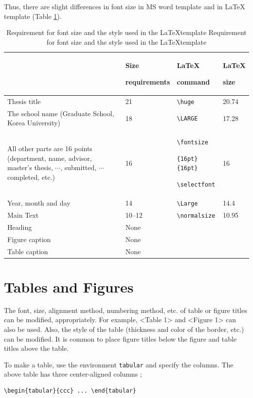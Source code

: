 Thus, there are slight differences in font size in MS word template and in \LaTeX ~ template
(Table \ref{tab:font size}). 

\begin{table}
\caption{Requirement for font size and the style used in the \LaTeX template Requirement for font size and the style used in the \LaTeX template}\label{tab:font size}
\bigskip
\begin{tabular}{>{\centering\arraybackslash}p{5.5cm}p{2.5cm}p{2.5cm}p{1.5cm}}
\toprule
&Size \par requirements & \LaTeX \par command & \LaTeX \par size \\\midrule
Thesis title			&21&\verb|\huge| & 20.74 \\\midrule
The school name (Graduate School, Korea University)
					&18&\verb|\LARGE| & 17.28 \\\midrule
All other parts are 16 points (department, name, advisor, master's thesis, \(\cdots\), submitted, \(\cdots\) completed, etc.)	
					&16&\verb|\fontsize| \par \verb|{16pt}{16pt}| \par \verb|\selectfont|  & 16 \\\midrule

Year, month and day	&14&\verb|\Large| & 14.4  \\\midrule
Main Text			&10--12&\verb|\normalsize| & 10.95 \\\midrule
Heading				&None&\\\midrule
Figure caption			&None&\\\midrule
Table caption			&None&\\\bottomrule
\end{tabular}
\end{table}

\section{Tables and Figures}\label{sec:table_figure}
The font, size, alignment method, numbering method, etc. of table or figure titles can be modified, appropriately. For example, <Table 1> and <Figure 1> can also be used. Also, the style of the table (thickness and color of the border, etc.) can be modified. It is common to place figure titles below the figure and table titles above the table.

To make a table, use the environment \texttt{tabular} and specify the columns.
The above table has three center-aligned columns ;
\begin{verbatim}
\begin{tabular}{ccc} ... \end{tabular}
\end{verbatim}

